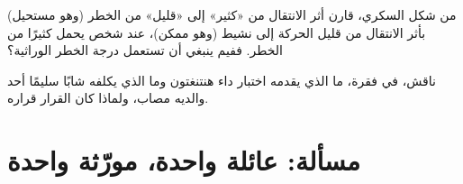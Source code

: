 \begin{exercise}[$\star\star\star$]\label{exo:g11:genes-and-disease:14}
من شكل السكري، قارن أثر الانتقال من «كثير» إلى «قليل» من  الخطر
(وهو مستحيل) بأثر الانتقال من قليل الحركة إلى نشيط (وهو ممكن)، عند
شخص يحمل كثيرًا من  الخطر. ففيم ينبغي أن تستعمل درجة الخطر
الوراثية؟
\end{exercise}

\begin{exercise}[$\star\star\star$]\label{exo:g11:genes-and-disease:15}
ناقش، في فقرة، ما الذي يقدمه اختبار داء هنتنغتون وما الذي يكلفه شابًا
سليمًا أحد والديه مصاب، ولماذا كان القرار قراره.
\end{exercise}

\section{مسألة: عائلة واحدة، مورّثة واحدة}

